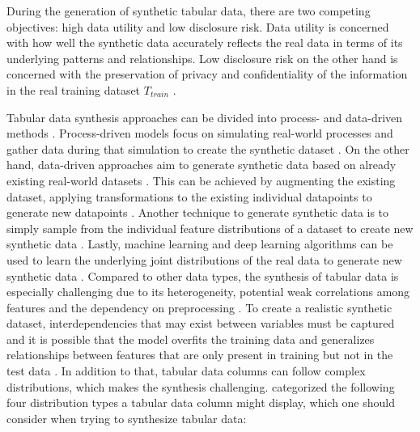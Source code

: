 During the generation of synthetic tabular data, there are two competing objectives: high data utility and low disclosure risk.
Data utility is concerned with how well the synthetic data accurately reflects the real data in terms of its underlying patterns and relationships.
Low disclosure risk on the other hand is concerned with the preservation of privacy and confidentiality of the information in the real training dataset $T_{train}$ \cite{little2021GenerativeAdversarialNetworksa}. 

Tabular data synthesis approaches can be divided into process- and data-driven methods \cite{goncalves2020GenerationEvaluationSynthetic}.
Process-driven models focus on simulating real-world processes and gather data during that simulation to create the synthetic dataset \cite{goncalves2020GenerationEvaluationSynthetic, kowalczyk2022TaxonomyUseSynthetic}.
On the other hand, data-driven approaches aim to generate synthetic data based on already existing real-world datasets \cite{goncalves2020GenerationEvaluationSynthetic, kowalczyk2022TaxonomyUseSynthetic}.
This can be achieved by augmenting the existing dataset, \ie applying transformations to the existing individual datapoints to generate new datapoints \cite{kowalczyk2022TaxonomyUseSynthetic}.
Another technique to generate synthetic data is to simply sample from the individual feature distributions of a dataset to create new synthetic data \cite{kowalczyk2022TaxonomyUseSynthetic}.
Lastly, machine learning and deep learning algorithms can be used to learn the underlying joint distributions of the real data to generate new synthetic data \cite{kowalczyk2022TaxonomyUseSynthetic}. 
Compared to other data types, the synthesis of tabular data is especially challenging due to its heterogeneity, potential weak correlations among features and the dependency on preprocessing \cite{borisov2022DeepNeuralNetworks, yoon2020VIMEExtendingSuccess, gorishniy2022EmbeddingsNumericalFeatures}.
To create a realistic synthetic dataset, interdependencies that may exist between variables must be captured and 
it is possible that the \gls{model} overfits the training data and generalizes relationships between features that are only present in training but not in the test data \cite{lederrey2022DATGANIntegratingExperta}.
In addition to that, tabular data columns can follow complex distributions, which makes the synthesis challenging.
\textcite{zhao2022CTABGANEnhancingTabular} categorized the following four distribution types a tabular data column might display, which one should consider when trying to synthesize tabular data:

